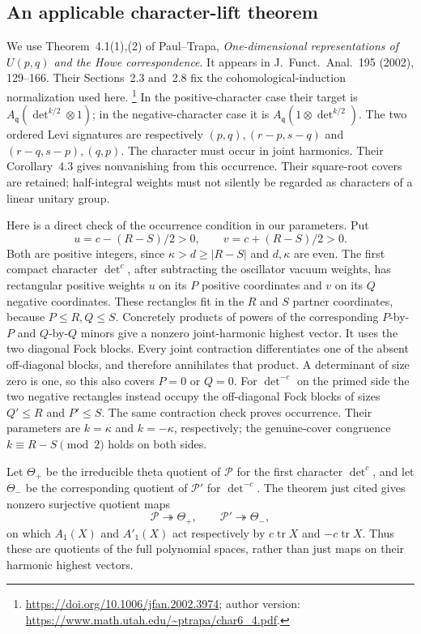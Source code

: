\subsection{An applicable character-lift theorem}
We use Theorem~4.1(1),(2) of Paul--Trapa,
\emph{One-dimensional representations of \(U(p,q)\)
and the Howe correspondence}.
It appears in J.~Funct.~Anal.~195 (2002), 129--166.
Their Sections~2.3 and~2.8 fix the cohomological-induction
normalization used here.
\footnote{\url{https://doi.org/10.1006/jfan.2002.3974};
author version:
\url{https://www.math.utah.edu/~ptrapa/char6_4.pdf}.}
In the positive-character case their target is
\(A_{\mathfrak q}(\det^{k/2}\otimes1)\);
in the negative-character case it is
\(A_{\mathfrak q}(1\otimes\det^{k/2})\).
The two ordered Levi signatures are respectively
\((p,q),(r-p,s-q)\) and
\((r-q,s-p),(q,p)\).
The character must occur in joint harmonics.
Their Corollary~4.3 gives nonvanishing from this occurrence.
Their square-root covers are retained; half-integral
weights must not silently be regarded as characters of
a linear unitary group.

Here is a direct check of the occurrence condition in our parameters.
Put
\[
       u=c-(R-S)/2>0,\qquad v=c+(R-S)/2>0.
\]
Both are positive integers, since \(\kappa>d\ge|R-S|\)
and \(d,\kappa\) are even.
The first compact character \(\det^c\), after subtracting
the oscillator vacuum weights, has rectangular positive
weights \(u\) on its \(P\) positive coordinates and \(v\)
on its \(Q\) negative coordinates.
These rectangles fit in the \(R\) and \(S\) partner
coordinates, because \(P\le R,Q\le S\).
Concretely products of powers of the corresponding
\(P\)-by-\(P\) and \(Q\)-by-\(Q\) minors give a nonzero
joint-harmonic highest vector.
It uses the two diagonal Fock blocks.
Every joint contraction differentiates one of the absent
off-diagonal blocks, and therefore annihilates that product.
A determinant of size zero is one, so this also covers
\(P=0\) or \(Q=0\).
For \(\det^{-c}\) on the primed side the two negative
rectangles instead occupy the off-diagonal Fock blocks
of sizes \(Q'\le R\) and \(P'\le S\).
The same contraction check proves occurrence.
Their parameters are \(k=\kappa\) and \(k=-\kappa\),
respectively; the genuine-cover congruence
\(k\equiv R-S\pmod2\) holds on both sides.

Let \(\Theta_+\) be the irreducible theta quotient of
\(\mathcal P\) for the first character \(\det^c\),
and let \(\Theta_-\) be the corresponding quotient of
\(\mathcal P'\) for \(\det^{-c}\).
The theorem just cited gives nonzero surjective quotient maps
\[
 \mathcal P\twoheadrightarrow\Theta_+,\qquad
                     \mathcal P'\twoheadrightarrow\Theta_-,
\]
on which \(A_1(X)\) and \(A'_1(X)\) act respectively by
\(c\operatorname{tr}X\) and \(-c\operatorname{tr}X\).
Thus these are quotients of the full polynomial spaces,
rather than just maps on their harmonic highest vectors.

